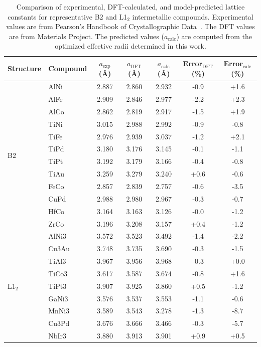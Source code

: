 \begin{table}[htbp]
\centering
\caption{Comparison of experimental, DFT-calculated, and model-predicted lattice constants for representative B2 and L1$_2$ intermetallic compounds. Experimental values are from Pearson's Handbook of Crystallographic Data~\citep{villars1997}. The DFT values are from Materials Project. The predicted values ($a_{\mathrm{calc}}$) are computed from the optimized effective radii determined in this work.}
\label{tab:exp_comparison}
\begin{tabular}{llccccc}
\toprule
Structure & Compound & $a_{\mathrm{exp}}$ (\AA) & $a_{\mathrm{DFT}}$ (\AA) & $a_{\mathrm{calc}}$ (\AA) & Error$_{\mathrm{DFT}}$ (\%) & Error$_{\mathrm{calc}}$ (\%) \\
\midrule
\multirow{12}{*}{B2} & AlNi & 2.887 & 2.860 & 2.932 & -0.9 & +1.6 \\
 & AlFe & 2.909 & 2.846 & 2.977 & -2.2 & +2.3 \\
 & AlCo & 2.862 & 2.819 & 2.917 & -1.5 & +1.9 \\
 & TiNi & 3.015 & 2.988 & 2.992 & -0.9 & -0.8 \\
 & TiFe & 2.976 & 2.939 & 3.037 & -1.2 & +2.1 \\
 & TiPd & 3.180 & 3.176 & 3.145 & -0.1 & -1.1 \\
 & TiPt & 3.192 & 3.179 & 3.166 & -0.4 & -0.8 \\
 & TiAu & 3.259 & 3.279 & 3.240 & +0.6 & -0.6 \\
 & FeCo & 2.857 & 2.839 & 2.757 & -0.6 & -3.5 \\
 & CuPd & 2.988 & 2.980 & 2.967 & -0.3 & -0.7 \\
 & HfCo & 3.164 & 3.163 & 3.126 & -0.0 & -1.2 \\
 & ZrCo & 3.196 & 3.208 & 3.157 & +0.4 & -1.2 \\
\midrule
\multirow{9}{*}{L1$_2$} & AlNi3 & 3.572 & 3.523 & 3.492 & -1.4 & -2.2 \\
 & Cu3Au & 3.748 & 3.735 & 3.690 & -0.3 & -1.5 \\
 & TiAl3 & 3.967 & 3.956 & 3.968 & -0.3 & +0.0 \\
 & TiCo3 & 3.617 & 3.587 & 3.674 & -0.8 & +1.6 \\
 & TiPt3 & 3.907 & 3.925 & 3.860 & +0.5 & -1.2 \\
 & GaNi3 & 3.576 & 3.537 & 3.553 & -1.1 & -0.6 \\
 & MnNi3 & 3.589 & 3.543 & 3.278 & -1.3 & -8.7 \\
 & Cu3Pd & 3.676 & 3.666 & 3.466 & -0.3 & -5.7 \\
 & NbIr3 & 3.880 & 3.913 & 3.901 & +0.9 & +0.5 \\
\bottomrule
\end{tabular}
\end{table}
